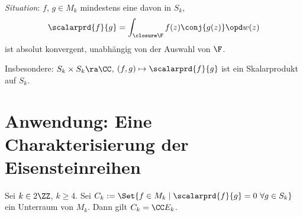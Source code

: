 \emph{Situation}: $f$, $g \in M_k$ mindestens eine davon in $S_k$,
\[
	\scalarprd{f}{g} = \int_{\closure \F} f(z) \conj{g(z)} \opd w(z)
\]
ist absolut konvergent, unabhängig von der Auswahl von $\F$.

Insbesondere: $S_k \times S_k \ra \CC$, $(f,g) \mapsto \scalarprd{f}{g}$ ist ein Skalarprodukt auf $S_k$.

\section{Anwendung: Eine Charakterisierung der Eisensteinreihen}

\begin{satz}
	Sei $k \in 2\ZZ$, $k \geq 4$. Sei $C_k := \Set{f \in M_k \mid \scalarprd{f}{g} = 0 \ \forall g \in S_k}$ ein Unterraum von $M_k$.
	Dann gilt $C_k = \CC E_k$.
\end{satz}


